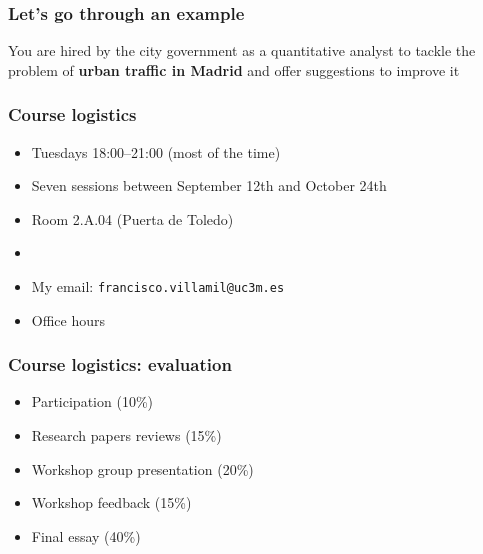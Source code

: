 \documentclass[aspectratio=43]{beamer}
\begin{document}
\begin{frame}
\frametitle{Let's go through an example}
\centering

You are hired by the city government as a quantitative analyst to tackle the problem of \textbf{urban traffic in Madrid} and offer suggestions to improve it

\end{frame}

\begin{frame}
\frametitle{Course logistics}
\centering

\begin{itemize}
  \item Tuesdays 18:00--21:00 (most of the time)
  \item Seven sessions between September 12th and October 24th
  \item Room 2.A.04 (Puerta de Toledo)
  \item[]
  \item My email: \texttt{francisco.villamil@uc3m.es}
  \item Office hours
\end{itemize}

\end{frame}

\begin{frame}
\frametitle{Course logistics: evaluation}
\centering

\begin{itemize}
  \item Participation (10\%)
  \item Research papers reviews (15\%)
  \item Workshop group presentation (20\%)
  \item Workshop feedback (15\%)
  \item Final essay (40\%)
\end{itemize}

\end{frame}
\end{document}
